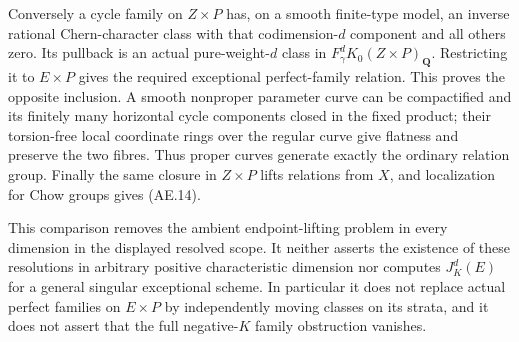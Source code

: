 Conversely a cycle family on $Z\times P$ has, on a smooth
finite-type model, an inverse rational Chern-character class
with that codimension-$d$ component and all others zero.  Its
pullback is an actual pure-weight-$d$ class in
$F_\gamma^dK_0(Z\times P)_{\mathbf Q}$.  Restricting it to
$E\times P$ gives the required exceptional perfect-family
relation.  This proves the opposite inclusion.  A smooth
nonproper parameter curve can be compactified and its finitely
many horizontal cycle components closed in the fixed product;
their torsion-free local coordinate rings over the regular
curve give flatness and preserve the two fibres.  Thus proper
curves generate exactly the ordinary relation group.
Finally the same closure in $Z\times P$ lifts relations from
$X$, and localization for Chow groups gives (AE.14).

This comparison removes the ambient endpoint-lifting problem in
every dimension in the displayed resolved scope.  It neither
asserts the existence of these resolutions in arbitrary positive
characteristic dimension nor computes $J_K^d(E)$ for a general
singular exceptional scheme.  In particular it does not replace
actual perfect families on $E\times P$ by independently moving
classes on its strata, and it does not assert that the full
negative-$K$ family obstruction vanishes.
